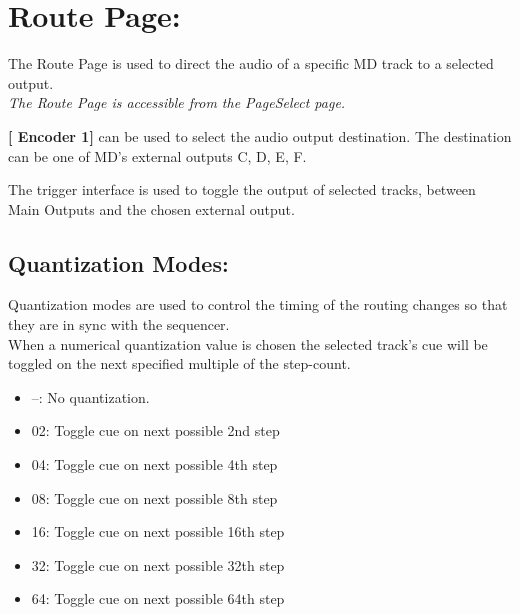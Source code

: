  \chapter{Route Page:}
 The Route Page is used to direct the audio of a specific MD track to a selected output. \\
 
\textit{The Route Page is accessible from the PageSelect page.}



\textbf{[ Encoder 1]} can be used to select the audio output destination. The destination can be one of MD's external outputs C, D, E, F.

The trigger interface is used to toggle the output of selected tracks, between Main Outputs and the chosen external output.


\section{Quantization Modes:}
 Quantization modes are used to control the timing of the routing changes so that they are in sync with the sequencer.
 \\
 When a numerical quantization value is chosen the selected track’s cue will be toggled on the next specified multiple of the step-count.
 \begin{itemize}
\item --: No quantization.
\item 02: Toggle cue on next possible 2nd step
\item 04: Toggle cue on next possible 4th step
\item 08: Toggle cue on next possible 8th step 
\item 16: Toggle cue on next possible 16th step 
\item 32: Toggle cue on next possible 32th step 
\item 64: Toggle cue on next possible 64th step
 \end{itemize}
 
 